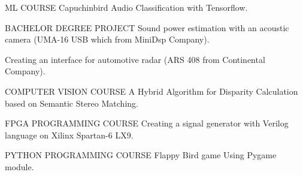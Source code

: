 \begin{cventries}
\cventry
    {ML COURSE} %
    {Capuchinbird Audio Classification with Tensorflow.} %
    {} %
    {} %
    {
    }


     \cventry
    {BACHELOR DEGREE PROJECT} %
    {Sound power estimation with an acoustic camera (UMA-16 USB which from MiniDsp Company).} %
    {} %
    {} %
    {
    }

  \cventry
    {} %
    {Creating an interface for automotive radar (ARS 408 from Continental Company).} %
    {} %
    {} %
    {
    }

  \cventry
    {COMPUTER VISION COURSE} %
    {A Hybrid Algorithm for Disparity Calculation based on Semantic Stereo Matching.} %
    {} %
    {} %
    {
    }

  \cventry
    {FPGA PROGRAMMING COURSE} %
    {Creating a signal generator with Verilog language on Xilinx Spartan-6 LX9.} %
    {} %
    {} %
    {
    }

\cventry
    {PYTHON PROGRAMMING COURSE} %
    {Flappy Bird game Using Pygame module.} %
    {} %
    {} %
    {
    }
\end{cventries}
